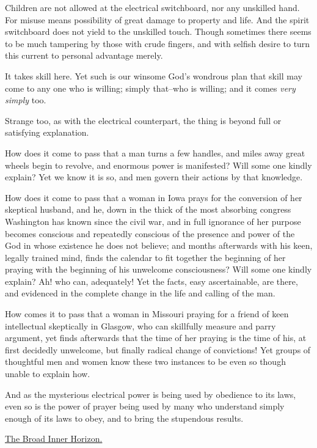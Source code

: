Children are not allowed at the electrical switchboard, nor any unskilled
hand. For misuse means possibility of great damage to property and life.
And the spirit switchboard does not yield to the unskilled touch. Though
sometimes there seems to be much tampering by those with crude fingers,
and with selfish desire to turn this current to personal advantage merely.

It takes skill here. Yet such is our winsome God's wondrous plan that
skill may come to any one who is willing; simply that--who is willing; and
it comes \textit{very simply} too.

Strange too, as with the electrical counterpart, the thing is beyond full
or satisfying explanation.

How does it come to pass that a man turns a few handles, and miles away
great wheels begin to revolve, and enormous power is manifested? Will some
one kindly explain? Yet we know it is so, and men govern their actions by
that knowledge.

How does it come to pass that a woman in Iowa prays for the conversion of
her skeptical husband, and he, down in the thick of the most absorbing
congress Washington has known since the civil war, and in full ignorance
of her purpose becomes conscious and repeatedly conscious of the presence
and power of the God in whose existence he does not believe; and months
afterwards with his keen, legally trained mind, finds the calendar to fit
together the beginning of her praying with the beginning of his unwelcome
consciousness? Will some one kindly explain? Ah! who can, adequately! Yet
the facts, easy ascertainable, are there, and evidenced in the complete
change in the life and calling of the man.

How comes it to pass that a woman in Missouri praying for a friend of keen
intellectual skeptically in Glasgow, who can skillfully measure and parry
argument, yet finds afterwards that the time of her praying is the time of
his, at first decidedly unwelcome, but finally radical change of
convictions! Yet groups of thoughtful men and women know these two
instances to be even so though unable to explain how.

And as the mysterious electrical power is being used by obedience to its
laws, even so is the power of prayer being used by many who understand
simply enough of its laws to obey, and to bring the stupendous results.



\underline{The Broad Inner Horizon.}



